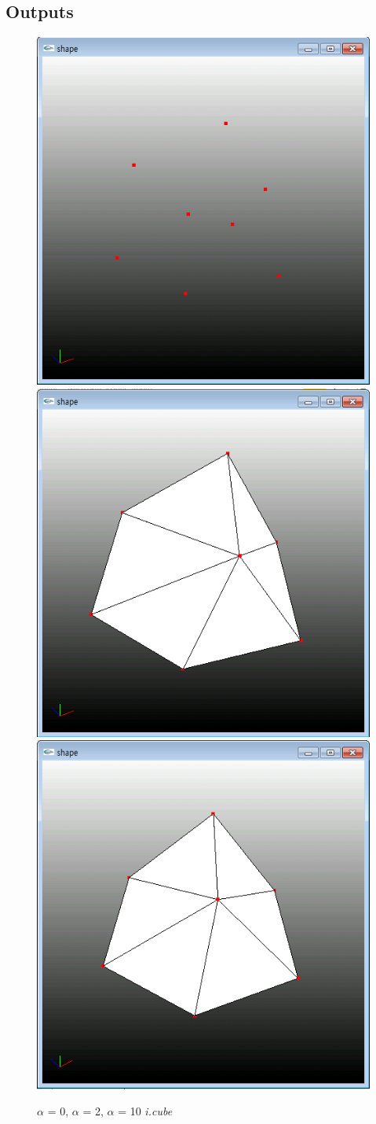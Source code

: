 \documentclass[11pt]{article}
\begin{document}
\subsection{Outputs}
\begin{figure}[ht]
\includegraphics[width=.5\textwidth]{FIGS/alpha0-icube}
\hspace{1cm}
\includegraphics[width=.5\textwidth]{FIGS/alpha2-icube}
\vspace{1cm}
\includegraphics[width=.5\textwidth]{FIGS/alpha10-icube}
\caption{$\alpha$ = 0, $\alpha$ = 2, $\alpha$ = 10 \textit{i.cube}}
\end{figure}
\end{document}
